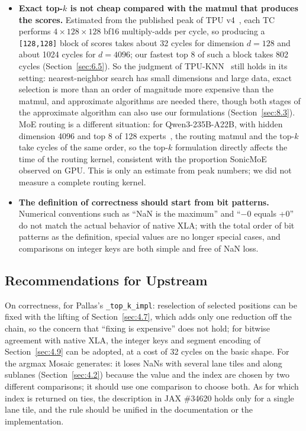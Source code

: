 \documentclass[sigconf,nonacm,balance=false]{acmart}
\newcommand{\code}[1]{\texttt{#1}}
\begin{document}
\begin{itemize}
\item \textbf{Exact top-$k$ is not cheap compared with the matmul that produces the scores.} Estimated from the published peak of TPU v4~\cite{jouppi2023tpuv4}, each TC performs $4 \times 128 \times 128$ bf16 multiply-adds per cycle, so producing a \code{[128,\allowbreak{}128]} block of scores takes about 32 cycles for dimension $d = 128$ and about 1024 cycles for $d = 4096$; our fastest top 8 of such a block takes 802 cycles (Section~\ref{sec:6.5}). So the judgment of TPU-KNN~\cite{chern2022tpuknn} still holds in its setting: nearest-neighbor search has small dimensions and large data, exact selection is more than an order of magnitude more expensive than the matmul, and approximate algorithms are needed there, though both stages of the approximate algorithm can also use our formulations (Section~\ref{sec:8.3}). MoE routing is a different situation: for Qwen3-235B-A22B, with hidden dimension 4096 and top 8 of 128 experts~\cite{qwen3,qwen3-config}, the routing matmul and the top-$k$ take cycles of the same order, so the top-$k$ formulation directly affects the time of the routing kernel, consistent with the proportion SonicMoE~\cite{guo2026sonicmoe} observed on GPU. This is only an estimate from peak numbers; we did not measure a complete routing kernel.
\item \textbf{The definition of correctness should start from bit patterns.} Numerical conventions such as ``NaN is the maximum'' and ``$-$0 equals +0'' do not match the actual behavior of native XLA; with the total order of bit patterns as the definition, special values are no longer special cases, and comparisons on integer keys are both simple and free of NaN loss.
\end{itemize}

\subsection{Recommendations for Upstream}
\label{sec:9.2}

On correctness, for Pallas's \code{\_\allowbreak{}top\_\allowbreak{}k\_\allowbreak{}impl}: reselection of selected positions can be fixed with the lifting of Section~\ref{sec:4.7}, which adds only one reduction off the chain, so the concern that ``fixing is expensive'' does not hold; for bitwise agreement with native XLA, the integer keys and segment encoding of Section~\ref{sec:4.9} can be adopted, at a cost of 32 cycles on the basic shape. For the argmax Mosaic generates: it loses NaNs with several lane tiles and along sublanes (Section~\ref{sec:4.2}) because the value and the index are chosen by two different comparisons; it should use one comparison to choose both. As for which index is returned on ties, the description in JAX \#34620 holds only for a single lane tile, and the rule should be unified in the documentation or the implementation.
\end{document}
